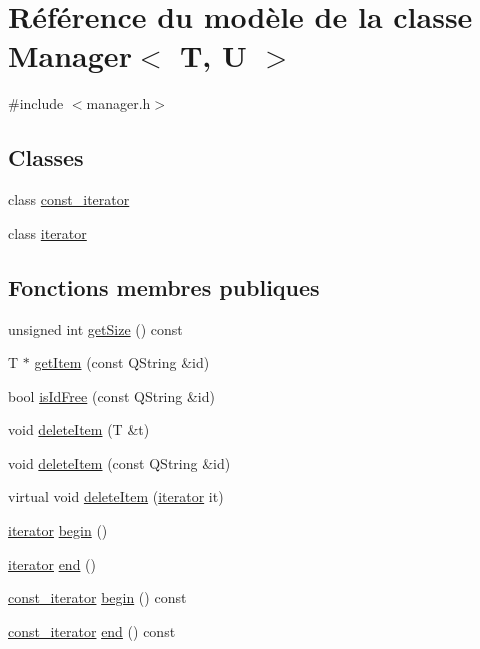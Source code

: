 \hypertarget{class_manager}{}\section{Référence du modèle de la classe Manager$<$ T, U $>$}
\label{class_manager}


{\ttfamily \#include $<$manager.\+h$>$}

\subsection*{Classes}
\begin{DoxyCompactItemize}
\item 
class \hyperlink{class_manager_1_1const__iterator}{const\+\_\+iterator}
\item 
class \hyperlink{class_manager_1_1iterator}{iterator}
\end{DoxyCompactItemize}
\subsection*{Fonctions membres publiques}
\begin{DoxyCompactItemize}
\item 
unsigned int \hyperlink{class_manager_adf66a1a70fdd9dc6cdaa13b0c5b4d834}{get\+Size} () const 
\item 
T $\ast$ \hyperlink{class_manager_a1a4856f30411e79051523887d0f251b8}{get\+Item} (const Q\+String \&id)
\item 
bool \hyperlink{class_manager_a8edf2ecc36ad33ba354ccabff3210d23}{is\+Id\+Free} (const Q\+String \&id)
\item 
void \hyperlink{class_manager_ac9136f779f6075c6be1437db35b31468}{delete\+Item} (T \&t)
\item 
void \hyperlink{class_manager_a6e003fb43ed160833e3094d1a59874e3}{delete\+Item} (const Q\+String \&id)
\item 
virtual void \hyperlink{class_manager_a151e9d0a033a7fa21c2d84221f22b01f}{delete\+Item} (\hyperlink{class_manager_1_1iterator}{iterator} it)
\item 
\hyperlink{class_manager_1_1iterator}{iterator} \hyperlink{class_manager_ad2d2c9ac1c765c3db47cb49f926e4494}{begin} ()
\item 
\hyperlink{class_manager_1_1iterator}{iterator} \hyperlink{class_manager_ab438bec0cd793093bee6c8f12c05b32a}{end} ()
\item 
\hyperlink{class_manager_1_1const__iterator}{const\+\_\+iterator} \hyperlink{class_manager_ad53e3636df68daf3cc47ce59da98db6d}{begin} () const 
\item 
\hyperlink{class_manager_1_1const__iterator}{const\+\_\+iterator} \hyperlink{class_manager_a15006050d43cbaef467051ff53faa8bd}{end} () const 
\end{DoxyCompactItemize}
